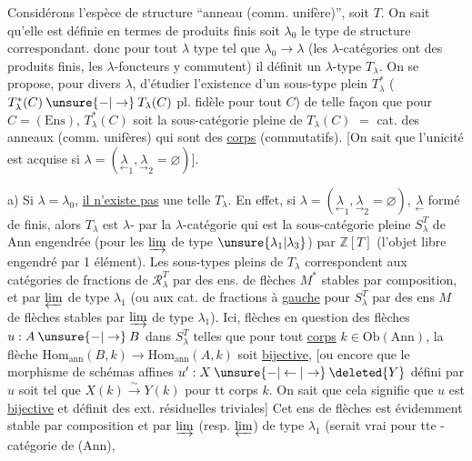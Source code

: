 Considérons l'espèce de structure ``anneau (comm. unifère)'', soit $T$.
On sait qu'elle est définie en termes de produits finis
soit $\lambda_0$  le type de structure correspondant. 
donc pour tout $\lambda$ type tel que $\lambda_0\longrightarrow\lambda$ (les
$\lambda$-catégories ont des produits finis, les $\lambda$-foncteurs y commutent)
il définit un $\lambda$-type $T_\lambda$. On se propose, pour divers
$\lambda$, d'étudier l'existence  d'un sous-type plein $T_\lambda^*$
($T_\lambda^*(C)\mathbin{\unsure{-|\to}}T_\lambda(C)$ pl. fidèle pour tout $C$) de telle façon que
pour $C=(\mathrm{Ens})$, $T_\lambda^*(C)$ soit la sous-catégorie  pleine de
$T_\lambda(C)$  $=$ cat. des anneaux (comm. unifères) qui sont des \uline{corps} \unsure{$\xi$}
(commutatifs). [On sait que l'unicité est acquise si $\lambda=(\underset{\leftarrow}{\lambda}_1,\underset{\longrightarrow}{\lambda}_2=\varnothing)$].

a) Si $\lambda=\lambda_0$, \uline{il n'existe pas} une telle $T_\lambda$. En effet,  
si $\lambda=(\underset{\leftarrow}{\lambda}_1,\underset{\rightarrow}{\lambda}_2=\varnothing)$, $\underset{\leftarrow}{\lambda}$ formé de  finis, alors
$T_\lambda$ est $\lambda$- par la $\lambda$-catégorie  qui est  la sous-catégorie pleine $S_\lambda^T$ de Ann engendrée (pour les $\varinjlim$ de type $\unsure{\lambda_1|\lambda_3}$)
par $\mathbb Z[T]$ (l'objet libre engendré par 1 élément). Les sous-types pleins de $T_\lambda$  correspondent aux
catégories de fractions de $\mathcal R_\lambda^T$ par des ens. de flèches $M^*$
stables par composition, et par $\varprojlim$ de type $\lambda_1$ (ou aux
cat.  de fractions à \uline{gauche} pour $S_\lambda^T$ par des ens
$M$ de flèches stables par $\varinjlim$ de type $\lambda_1$). Ici, 
flèches en question   des flèches $u:A\mathbin{\unsure{-|\to}}B$
dans $S_\lambda^T$  telles que pour tout  \uline{corps} $k\in\mathrm{Ob}(\mathrm{Ann})$,
la flèche $\mathrm{Hom}_{\mathrm{ann}}(B,k)\longrightarrow\mathrm{Hom}_{\mathrm{ann}}(A,k)$ soit \uline{bijective}, [ou
encore que le  morphisme de schémas affines $u':X\mathbin{\unsure{-|\leftarrow|\to}}\deleted{Y}$
défini par $u$ soit tel que $X(k)\xrightarrow{\sim}Y(k)$ pour tt corps $k$.
On sait que cela signifie que $u$ est \uline{bijective} et définit
des ext. résiduelles triviales]  Cet ens de flèches
est évidemment stable par composition et par $\varinjlim$ (resp. $\varprojlim$)
de type $\lambda_1$ (serait vrai pour tte -catégorie de (Ann),
